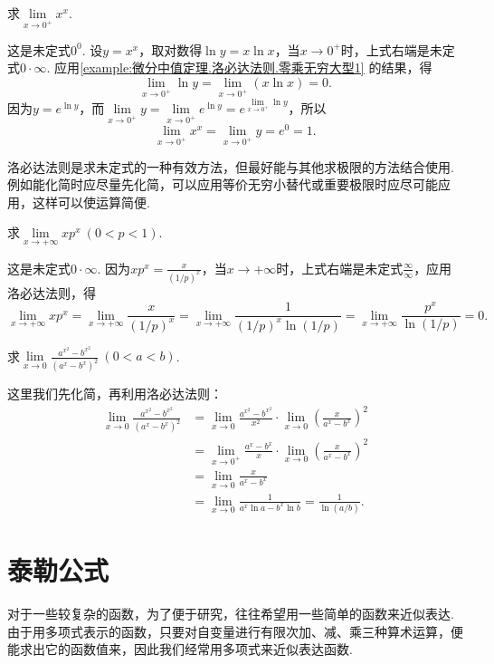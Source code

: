 \begin{example}\label{example:微分中值定理.洛必达法则.零次方零型1}
\def\l{\lim\limits_{x\to0^+}}%
求\(\lim\limits_{x\to0^+}{x^x}\).
\begin{solution}
这是未定式\(0^0\).
设\(y = x^x\)，取对数得\(\ln y = x \ln x\)，当\(x\to0^+\)时，上式右端是未定式\(0\cdot\infty\).
应用\cref{example:微分中值定理.洛必达法则.零乘无穷大型1} 的结果，得\[
\l \ln y = \l (x \ln x) = 0.
\]
因为\(y = e^{\ln y}\)，而\(\l y = \l e^{\ln y} = e^{\l \ln y}\)，所以\[
\l x^x = \l y = e^0 = 1.
\]
\end{solution}
\end{example}

洛必达法则是求未定式的一种有效方法，但最好能与其他求极限的方法结合使用.
例如能化简时应尽量先化简，可以应用等价无穷小替代或重要极限时应尽可能应用，这样可以使运算简便.

\begin{example}\label{example:微分中值定理.洛必达法则.零乘无穷大型2}
\def\l{\lim\limits_{x\to+\infty}}%
求\(\l x p^x\ (0<p<1)\).
\begin{solution}
这是未定式\(0\cdot\infty\).
因为\(x p^x =  \frac{x}{(1/p)^x}\)，当\(x\to+\infty\)时，上式右端是未定式\(\frac{\infty}{\infty}\)，应用洛必达法则，得\[
\l x p^x
= \l \frac{x}{(1/p)^x}
= \l \frac{1}{(1/p)^x \ln(1/p)}
= \l \frac{p^x}{\ln(1/p)}
= 0.
\]
\end{solution}
\end{example}

\begin{example}
\def\l{\lim\limits_{x\to0}}%
求\(\l \frac{a^{x^2}-b^{x^2}}{(a^x-b^x)^2}\ (0<a<b)\).
\begin{solution}
这里我们先化简，再利用洛必达法则：\begin{align*}
\l \frac{a^{x^2}-b^{x^2}}{(a^x-b^x)^2}
&= \l \frac{a^{x^2}-b^{x^2}}{x^2} \cdot \l \left(\frac{x}{a^x-b^x}\right)^2 \\
&= \lim\limits_{x\to0^+} \frac{a^x-b^x}{x} \cdot \l \left(\frac{x}{a^x-b^x}\right)^2 \\
&= \l \frac{x}{a^x-b^x} \\
&= \l \frac{1}{a^x \ln a - b^x \ln b}
= \frac{1}{\ln(a/b)}.
\end{align*}
\end{solution}
\end{example}

\section{泰勒公式}\label{section:微分中值定理.泰勒公式}
对于一些较复杂的函数，为了便于研究，往往希望用一些简单的函数来近似表达.由于用多项式表示的函数，只要对自变量进行有限次加、减、乘三种算术运算，便能求出它的函数值来，因此我们经常用多项式来近似表达函数.

